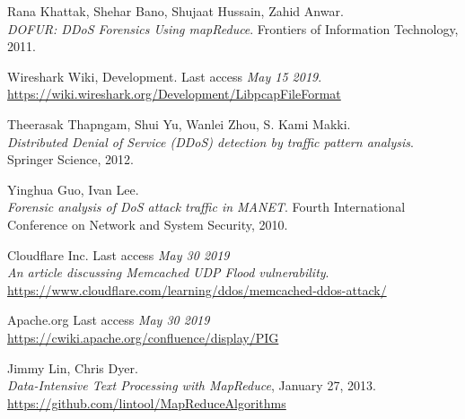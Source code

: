 \newpage
\begin{thebibliography}{9}
Rana Khattak, Shehar Bano, Shujaat Hussain, Zahid Anwar. 
\\\textit{DOFUR: DDoS Forensics Using mapReduce}. Frontiers of Information Technology, 2011.

Wireshark Wiki, Development. Last access \textit{May 15 2019}.
\\\url{https://wiki.wireshark.org/Development/LibpcapFileFormat}

Theerasak Thapngam, Shui Yu, Wanlei Zhou, S. Kami Makki.
\\\textit{Distributed Denial of Service (DDoS) detection by traffic pattern analysis}.
Springer Science, 2012.

Yinghua Guo, Ivan Lee.
\\\textit{Forensic analysis of DoS attack traffic in MANET}. 
Fourth International Conference on Network and System Security, 2010.

Cloudflare Inc. Last access \textit{May 30 2019}
\\\textit{An article discussing Memcached UDP Flood vulnerability}. 
\\\url{https://www.cloudflare.com/learning/ddos/memcached-ddos-attack/}

Apache.org Last access \textit{May 30 2019}
\\\url{https://cwiki.apache.org/confluence/display/PIG}

Jimmy Lin, Chris Dyer.
\\\textit{Data-Intensive Text Processing with MapReduce}, January 27, 2013.
\\\url{https://github.com/lintool/MapReduceAlgorithms}

\end{thebibliography}